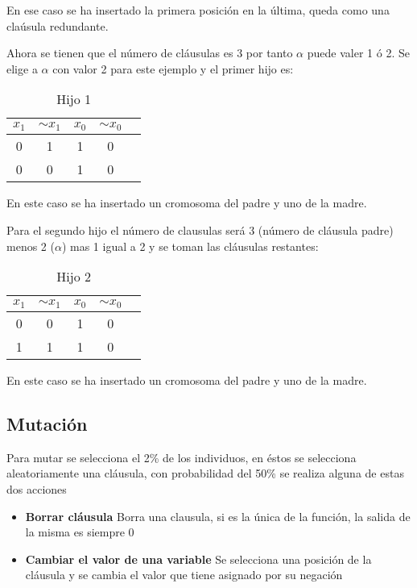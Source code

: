 \documentclass[letter]{article}
\begin{document}
En ese caso se ha insertado la primera posición en la última, queda como una claúsula redundante.

Ahora se tienen que el número de cláusulas es 3 por tanto $\alpha$ puede valer 1 ó 2. Se elige a $\alpha$ con valor 2 para este ejemplo y el primer hijo es:

\begin{table}[H]
	\centering
	\caption{Hijo 1}
	\begin{tabular}{|c | c | c|  c|  c|}
		\hline
		$x_1$ & $ \sim{x_1}$ & $x_0$ & $ \sim{x_0}$\\
		\hline
		0 & 1& 1 & 0\\
		\hline
		0 & 0& 1 & 0\\
		\hline
	\end{tabular}
\end{table}

En este caso se ha insertado un cromosoma del padre y uno de la madre.


Para el segundo hijo el número de clausulas será 3 (número de cláusula padre) menos 2 ($\alpha$) mas 1 igual a 2 y se toman las cláusulas restantes:

\begin{table}[H]
	\centering
	\caption{Hijo 2}
	\begin{tabular}{|c | c | c|  c|  c|}
		\hline
		$x_1$ & $ \sim{x_1}$ & $x_0$ & $ \sim{x_0}$\\
		\hline
		0 & 0& 1 & 0\\
		\hline
		1 & 1& 1 & 0\\
		\hline
	\end{tabular}
\end{table}

En este caso se ha insertado un cromosoma del padre y uno de la madre.

\subsection{Mutación}

Para mutar se selecciona el 2\% de los individuos, en éstos se selecciona aleatoriamente una cláusula, con probabilidad del 50\% se realiza alguna de estas dos acciones

\begin{itemize}
	\item \textbf{Borrar cláusula} Borra una clausula, si es la única de la función, la salida de la misma es siempre 0
	\item \textbf{Cambiar el valor de una variable} Se selecciona una posición de la cláusula y se cambia el valor que tiene asignado por su negación
\end{itemize}
\end{document}
